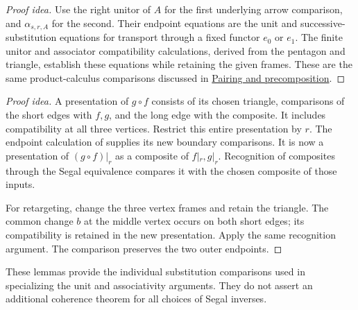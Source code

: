 \documentclass[11pt]{article}
\begin{document}
\begin{proof}[Proof idea]
Use the right unitor of $A$ for the first underlying arrow comparison,
and $\alpha_{s,r,A}$ for the second. Their endpoint equations are the
unit and successive-substitution equations for transport through a
fixed functor $e_0$ or $e_1$. The finite unitor and associator compatibility calculations, derived
from the pentagon and triangle, establish these equations while retaining
the given frames.
These are the same product-calculus comparisons discussed in
\href{supplementary-pairing-and-precomposition.html}{Pairing and precomposition}.
\end{proof}

\begin{proof}[Proof idea]
A presentation of $g\circ f$ consists of its chosen triangle, comparisons
of the short edges with $f,g$, and the long edge with the composite.
It includes compatibility at all three vertices.
Restrict this entire presentation by $r$. The endpoint calculation of
 supplies its new boundary
comparisons. It is now a presentation of $(g\circ f)|_r$ as a composite
of $f|_r,g|_r$. Recognition of composites through the Segal equivalence
compares it with the chosen composite of those inputs.

For retargeting, change the three vertex frames and retain the triangle.
The common change $b$ at the middle vertex occurs on both short edges;
its compatibility is retained in the new presentation. Apply the same
recognition argument. The comparison preserves the two outer endpoints.
\end{proof}

These lemmas provide the individual substitution comparisons used in
specializing the unit and associativity arguments. They do not assert
an additional coherence theorem for all choices of Segal inverses.
\end{document}
